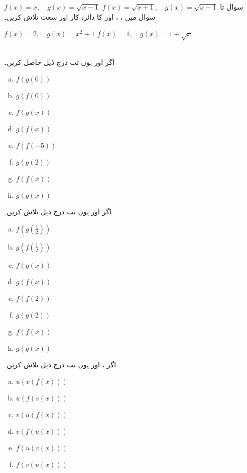 $f(x)=x,\quad g(x)=\sqrt{x-1}$
$f(x)=\sqrt{x+1},\quad g(x)=\sqrt{x-1}$
سوال  تا سوال  میں ، ،  اور  کا دائرہ کار اور سعت تلاش کریں۔

$f(x)=2,\quad g(x)=x^2+1$
$f(x)=1,\quad g(x)=1+\sqrt{x}$

\\

اگر  اور  ہوں تب درج ذیل حاصل کریں۔
\begin{multicols}{4}
\begin{enumerate}[a.]
\item
$f(g(0))$
\item
$g(f(0))$
\item
$f(g(x))$
\item
$g(f(x))$
\item
$f(f(-5))$
\item
$g(g(2))$
\item
$f(f(x))$
\item
$g(g(x))$
\end{enumerate}
\end{multicols}
اگر  اور  ہوں تب درج ذیل تلاش کریں۔
\begin{multicols}{4}
\begin{enumerate}[a.]
\item
$f(g(\tfrac{1}{2}))$
\item
$g(f(\tfrac{1}{2}))$
\item
$f(g(x))$
\item
$g(f(x))$
\item
$f(f(2))$
\item
$g(g(2))$
\item
$f(f(x))$
\item
$g(g(x))$
\end{enumerate}
\end{multicols}
اگر ،  اور  ہوں تب درج ذیل تلاش کریں۔
\begin{multicols}{4}
\begin{enumerate}[a.]
\item
$u(v(f(x)))$
\item
$u(f(v(x)))$
\item
$v(u(f(x)))$
\item
$v(f(u(x)))$
\item
$f(u(v(x)))$
\item
$f(v(u(x)))$
\end{enumerate}
\end{multicols}
